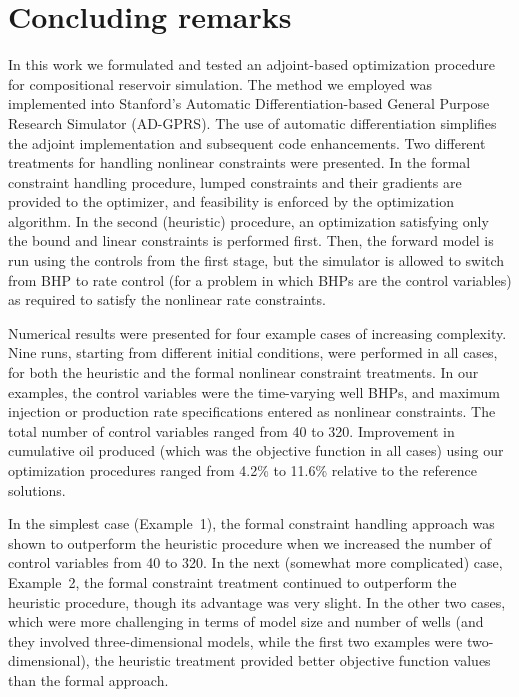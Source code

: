 \documentclass[twocolumn,numbook]{svjour3}          %
\begin{document}
\section{Concluding remarks}  \label{sec:conclusions}
In this work we formulated and tested an adjoint-based optimization procedure
for compositional reservoir simulation. The method we employed was implemented into
Stanford's Automatic Differentiation-based General Purpose Research Simulator
(AD-GPRS). The use of automatic differentiation simplifies the adjoint
implementation and subsequent code enhancements. Two different treatments for
handling nonlinear constraints were presented. In the formal constraint handling
procedure, lumped constraints and their gradients are provided to the optimizer,
and feasibility is enforced by the optimization algorithm. In the second
(heuristic) procedure, an optimization satisfying only the bound and linear
constraints is performed first. Then, the forward model is run using the
controls from the first stage, but the simulator is allowed to switch from BHP
to rate control (for a problem in which BHPs are the control variables) as
required to satisfy the nonlinear rate constraints.


Numerical results were presented for four example cases of increasing
complexity. Nine runs, starting from different initial conditions, were
performed in all cases, for both the heuristic and the formal nonlinear
constraint treatments. In our examples, the control variables were the time-varying well BHPs, and maximum injection or production rate specifications entered as nonlinear
constraints. The total number of control variables ranged from 40 to 320. Improvement in cumulative oil produced (which was the objective function in all cases) using our optimization procedures ranged from 4.2\% to 11.6\% relative to the reference solutions. 

In the simplest case (Example~1), the formal constraint handling approach was shown to outperform the heuristic procedure when we increased the number of control variables from 40 to 320. In the next (somewhat more complicated) case, Example~2, the formal constraint treatment continued to outperform the heuristic procedure, though its advantage was very slight. In the other two cases, which were more challenging in terms of model size and number of wells (and they involved three-dimensional models, while the first two examples were two-dimensional), the heuristic treatment provided better objective function values than the formal approach. 
\end{document}
